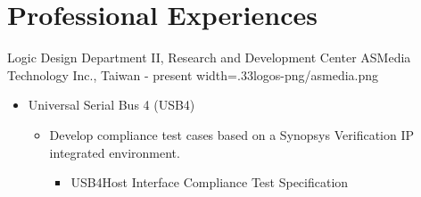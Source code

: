 \documentclass{cvclass}
\newcommand{\simplemmyy}[3]{\shortmmyyformat\formatdate{#3}{#2}{#1}}
\begin{document}
\makeinfo


\section{Professional Experiences}

    {Logic Design Department II, Research and Development Center}
    {ASMedia Technology Inc., Taiwan}
    {\simplemmyy{2023}{7}{17} - present}
    {width=.33\linewidth}{logos-png/asmedia.png}
    {\begin{itemize}
        \item Universal Serial Bus 4 (USB4\textsuperscript{\tiny\textregistered})
        \begin{itemize}
            \item Develop compliance test cases based on a Synopsys\textsuperscript{\tiny\textregistered} Verification IP integrated environment.
            \begin{itemize}
                \item USB4\texttrademark Host Interface Compliance Test Specification
            \end{itemize}
        \end{itemize}
    \end{itemize}}
\end{document}
